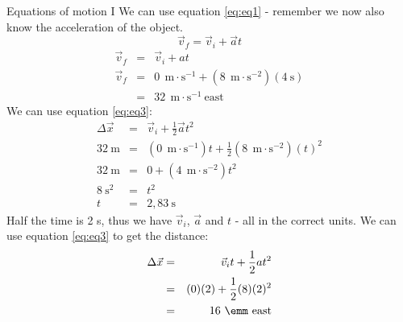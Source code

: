 \begin{wex}{Equations of motion I}
{ We can use equation \ref{eq:eq1} - remember we now also know the acceleration of the object.
\begin{displaymath}
\vec{v}_f = \vec{v}_i + \vec{a}t
\end{displaymath}
\begin{eqnarray*}
\vec{v}_f &=& \vec{v}_i + at\\
\vec{v}_f &=& 0\ ~\text{m}\cdot \text{s}^{-1} +(8\ ~\text{m}\cdot \text{s}^{-2})(4\ \text{s})\\
&=&32\ ~\text{m}\cdot \text{s}^{-1}~\text{east}
\end{eqnarray*}
We can use equation \ref{eq:eq3}:
\begin{eqnarray*}
\Delta \vec{x} &=& \vec{v}_i + \frac{1}{2}\vec{a}t^2\\
32\ \text{m} &=& (0\ ~\text{m}\cdot \text{s}^{-1})t + \frac{1}{2}(8\ ~\text{m}\cdot \text{s}^{-2})(t)^2\\
32\ \text{m} &=& 0 + (4\ ~\text{m}\cdot \text{s}^{-2})t^2\\
8\ \text{s}^2 &=& t^2\\
t &=& 2,83~\text{s}
\end{eqnarray*}
Half the time is 2 s, thus we have $\vec{v}_i$, $\vec{a}$ and $t$ - all in the correct units. We can use equation \ref{eq:eq3} to get the distance:
\begin{eqnarray*}
\Delta \vec{x}&=&\vec{v}_it+\frac{1}{2}at^2\\
&=&(0)(2)+\frac{1}{2}(8)(2)^2\\
&=&16\ \emm~\text{east}
\end{eqnarray*}
}
\end{wex}
    \noindent
\label{m38796*secfhsst!!!underscore!!!id5845}
